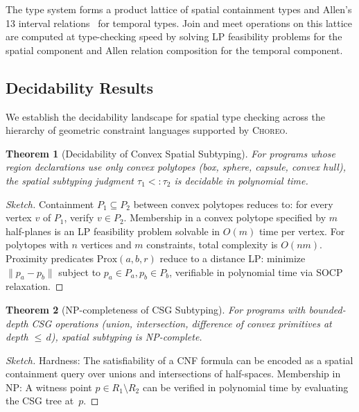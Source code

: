 \documentclass[11pt,a4paper]{article}
\newtheorem{theorem}{Theorem}
\begin{document}
The type system forms a product lattice of spatial containment types and Allen's
13 interval relations~\cite{allen1983} for temporal types.
Join and meet operations on this lattice are computed at type-checking speed by
solving LP feasibility problems for the spatial component and Allen relation
composition for the temporal component.

\subsection{Decidability Results}\label{sec:decidability}

We establish the decidability landscape for spatial type checking across
the hierarchy of geometric constraint languages supported by \textsc{Choreo}.

\begin{theorem}[Decidability of Convex Spatial Subtyping]\label{thm:decidability-convex}
For programs whose region declarations use only convex polytopes
(box, sphere, capsule, convex hull), the spatial subtyping judgment
$\tau_1 <: \tau_2$ is decidable in polynomial time.
\end{theorem}

\begin{proof}[Sketch]
Containment $P_1 \subseteq P_2$ between convex polytopes reduces to:
for every vertex $v$ of $P_1$, verify $v \in P_2$.
Membership in a convex polytope specified by $m$ half-planes is an LP
feasibility problem solvable in $O(m)$ time per vertex.
For polytopes with $n$ vertices and $m$ constraints,
total complexity is $O(nm)$.
Proximity predicates $\text{Prox}(a, b, r)$ reduce to a distance LP:
minimize $\|p_a - p_b\|$ subject to $p_a \in P_a, p_b \in P_b$, verifiable
in polynomial time via SOCP relaxation.
\end{proof}

\begin{theorem}[NP-completeness of CSG Subtyping]\label{thm:np-csg}
For programs with bounded-depth CSG operations (union, intersection, difference
of convex primitives at depth ${\le}\,d$), spatial subtyping is NP-complete.
\end{theorem}

\begin{proof}[Sketch]
Hardness: The satisfiability of a CNF formula can be encoded as a spatial
containment query over unions and intersections of half-spaces.
Membership in NP: A witness point $p \in R_1 \setminus R_2$ can be verified
in polynomial time by evaluating the CSG tree at~$p$.
\end{proof}
\end{document}
